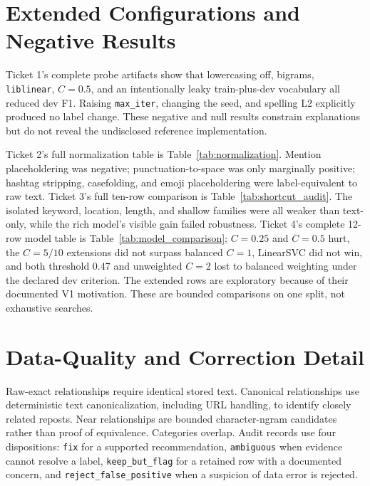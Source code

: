 \documentclass[conference]{IEEEtran}
\begin{document}



\appendices

\section{Extended Configurations and Negative Results}

Ticket 1's complete probe artifacts show that lowercasing off, bigrams, \texttt{liblinear}, $C=0.5$, and an intentionally leaky train-plus-dev vocabulary all reduced dev F1. Raising \texttt{max\_iter}, changing the seed, and spelling L2 explicitly produced no label change. These negative and null results constrain explanations but do not reveal the undisclosed reference implementation.

Ticket 2's full normalization table is Table~\ref{tab:normalization}. Mention placeholdering was negative; punctuation-to-space was only marginally positive; hashtag stripping, casefolding, and emoji placeholdering were label-equivalent to raw text. Ticket 3's full ten-row comparison is Table~\ref{tab:shortcut_audit}. The isolated keyword, location, length, and shallow families were all weaker than text-only, while the rich model's visible gain failed robustness. Ticket 4's complete 12-row model table is Table~\ref{tab:model_comparison}; $C=0.25$ and $C=0.5$ hurt, the $C=5/10$ extensions did not surpass balanced $C=1$, LinearSVC did not win, and both threshold 0.47 and unweighted $C=2$ lost to balanced weighting under the declared dev criterion. The extended rows are exploratory because of their documented V1 motivation. These are bounded comparisons on one split, not exhaustive searches.

\section{Data-Quality and Correction Detail}

Raw-exact relationships require identical stored text. Canonical relationships use deterministic text canonicalization, including URL handling, to identify closely related reposts. Near relationships are bounded character-ngram candidates rather than proof of equivalence. Categories overlap. Audit records use four dispositions: \texttt{fix} for a supported recommendation, \texttt{ambiguous} when evidence cannot resolve a label, \texttt{keep\_but\_flag} for a retained row with a documented concern, and \texttt{reject\_false\_positive} when a suspicion of data error is rejected.
\end{document}
